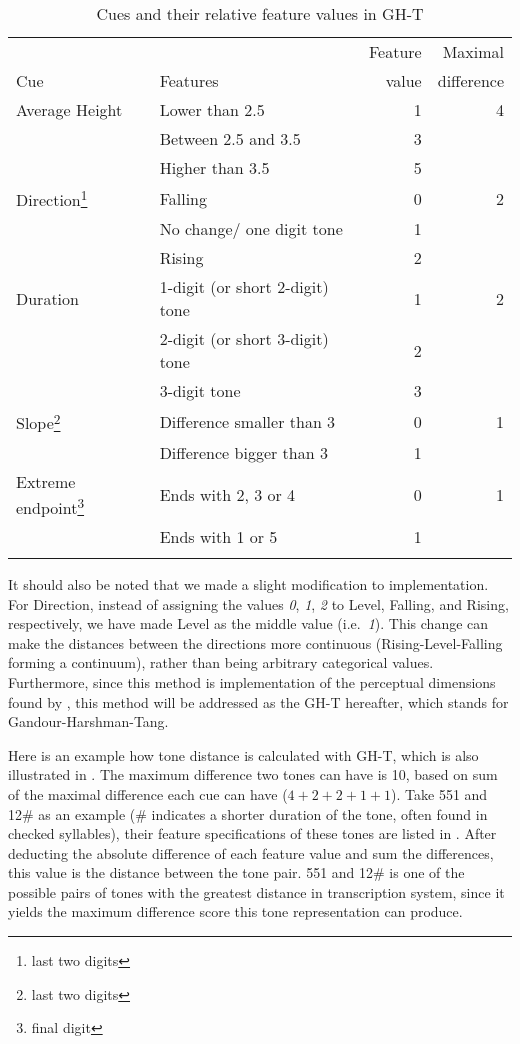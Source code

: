 \documentclass[output=paper, chinesefont]{langscibook}
\begin{document}
\begin{table}
\begin{tabular}{llrr}
\lsptoprule
      &            & Feature & Maximal\\
{Cue} & {Features} & value & difference\\\midrule
Average Height & Lower than 2.5 & 1 & 4\\
               & Between 2.5 and 3.5 & 3 & \\
               & Higher than 3.5 & 5 & \\\addlinespace
Direction\footnote{last two digits} & Falling & 0 & 2\\
                            & No change/ one digit tone & 1 & \\
                            & Rising & 2 & \\\addlinespace
Duration & 1-digit (or short 2-digit) tone & 1 & 2\\
         & 2-digit (or short 3-digit) tone & 2 & \\
         & 3-digit tone & 3 & \\\addlinespace
Slope\footnote{last two digits} & Difference smaller than 3 & 0 & 1\\
                        & Difference bigger than 3 & 1 & \\\addlinespace
Extreme endpoint\footnote{final digit} & Ends with 2, 3 or 4 & 0 & 1\\
                               & Ends with 1 or 5 & 1 & \\
\lspbottomrule
\end{tabular}
\caption{Cues and their relative feature values in GH-T}
\label{tab:sung:5}
\end{table}

It should also be noted that we made a slight modification to  implementation. For Direction, instead of assigning the values \textit{0}, \textit{1}, \textit{2} to Level, Falling, and Rising, respectively, we have made Level as the middle value (i.e.~\textit{1}). This change can make the distances between the directions more continuous (Rising-Level-Falling forming a continuum), rather than being arbitrary categorical values. Furthermore, since this method is  implementation of the perceptual dimensions found by \citet{GandourHarshman1978}, this method will be addressed as the GH-T hereafter, which stands for Gandour-Harshman-Tang.

Here is an example how tone distance is calculated with GH-T, which is also illustrated in . The maximum difference two tones can have is 10, based on sum of the maximal difference each cue can have ($4+2+2+1+1$). Take 551 and 12\# as an example (\# indicates a shorter duration of the tone, often found in checked syllables), their feature specifications of these tones are listed in . After deducting the absolute difference of each feature value and sum the differences, this value is the distance between the tone pair. 551 and 12\# is one of the possible pairs of tones with the greatest distance in  transcription system, since it yields the maximum difference score this tone representation can produce.
\end{document}
